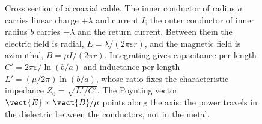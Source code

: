 \begin{figure}[htbp]
\centering
{}
\caption[Coaxial-cable cross section]{Cross section of a coaxial cable.
The inner conductor of radius $a$ carries linear charge $+\lambda$ and
current $I$; the outer conductor of inner radius $b$ carries $-\lambda$
and the return current. Between them the electric field is radial,
$E = \lambda/(2\pi\varepsilon r)$, and the magnetic field is azimuthal,
$B = \mu I/(2\pi r)$. Integrating gives capacitance per length
$C' = 2\pi\varepsilon/\ln(b/a)$ and inductance per length
$L' = (\mu/2\pi)\ln(b/a)$, whose ratio fixes the characteristic
impedance $Z_0 = \sqrt{L'/C'}$. The Poynting vector $\vect{E}\times
\vect{B}/\mu$ points along the axis: the power travels in the dielectric
between the conductors, not in the metal.}
\label{fig:vol04ch08:coax-cross-section}
\end{figure}
